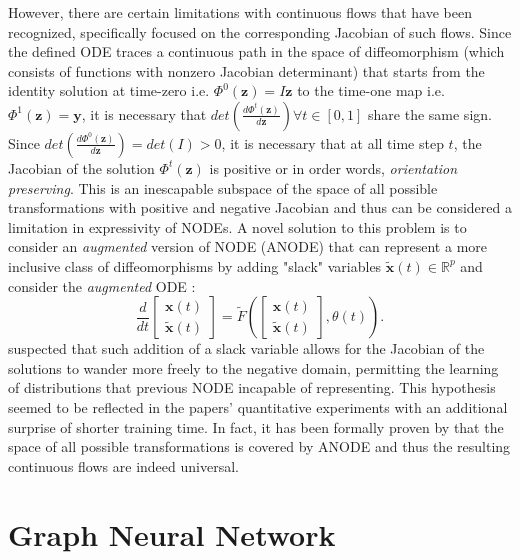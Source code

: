 However, there are certain limitations with continuous flows that have been
recognized, specifically focused on the corresponding Jacobian of such flows.
Since the defined ODE traces a continuous path in the space of diffeomorphism
(which consists of functions with nonzero Jacobian determinant) that starts from the identity solution at
time-zero i.e. $\Phi^0(\mathbf{z}) = I\mathbf{z}$ to the time-one map
i.e. $\Phi^1(\mathbf{z}) = \mathbf{y}$, it is necessary that
$det\left(\frac{d\Phi^t(\mathbf{z})}{d\mathbf{z}}\right) \forall t \in [0,1]$
share the same sign. Since
$det\left(\frac{d\Phi^0(\mathbf{z})}{d\mathbf{z}}\right) = det(I) > 0$, it is
necessary that at all time step $t$, the Jacobian of the solution
$\Phi^t(\mathbf{z})$ is positive or in order words, \textit{orientation preserving}. This
is an inescapable subspace of the space of all possible transformations with positive and
negative Jacobian and thus can be considered a limitation in expressivity of
NODEs. A novel solution to this problem is to consider an \textit{augmented} version of
NODE (ANODE) that can represent a more inclusive class of diffeomorphisms by adding
"slack" variables $\tilde{\mathbf{x}}(t) \in \mathbb{R}^p$ and consider the
\textit{augmented} ODE \citep{dupontAugmentedNeuralODEs2019}:
$$
\frac{d}{dt} \begin{bmatrix}
  \mathbf{x}(t) \\
  \tilde{\mathbf{x}}(t)
\end{bmatrix} = \tilde{F}\left( \begin{bmatrix}
  \mathbf{x}(t) \\
  \tilde{\mathbf{x}}(t)
\end{bmatrix}, \theta(t)\right)
.$$
\citep{dupontAugmentedNeuralODEs2019} suspected that such addition of a slack
variable allows for the Jacobian of the solutions to wander more freely to the
negative domain, permitting the learning of distributions that previous NODE incapable of
representing. This hypothesis seemed to be reflected in the papers' quantitative
experiments with an additional surprise of shorter training time. In fact, it
has been formally proven by \citep{zhangApproximationCapabilitiesNeural2020} that
the space of all possible transformations is covered by ANODE and thus the
resulting continuous flows are indeed universal.


\chapter{Graph Neural Network}
\label{c:gnn}

